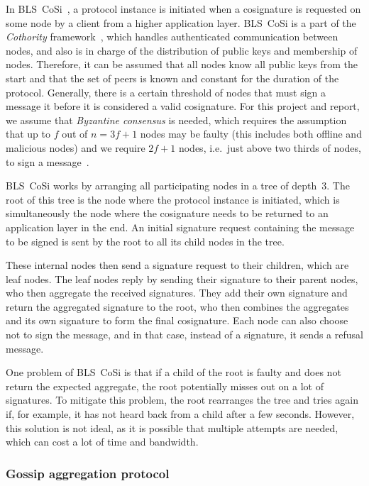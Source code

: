 In BLS~CoSi~\cite{Blscosi}, a protocol instance is initiated when a cosignature is requested on some node by a client from a higher application layer.
BLS~CoSi is a part of the \emph{Cothority} framework~\cite{Coth}, which handles authenticated communication between nodes, and also is in charge of the distribution of public keys and membership of nodes.
Therefore, it can be assumed that all nodes know all public keys from the start and that the set of peers is known and constant for the duration of the protocol. Generally, there is a certain threshold of nodes that must sign a message it before it is considered a valid cosignature.
For this project and report, we assume that \emph{Byzantine consensus} is needed, which requires the assumption that up to $f$ out of $n = 3f+1$ nodes may be faulty (this includes both offline and malicious nodes) and we require $2f+1$ nodes, i.e.~just above two thirds of nodes, to sign a message~\cite{Koko16}.

BLS~CoSi works by arranging all participating nodes in a tree of depth~3.
The root of this tree is the node where the protocol instance is initiated, which is simultaneously the node where the cosignature needs to be returned to an application layer in the end.
An initial signature request containing the message to be signed is sent by the root to all its child nodes in the tree.

These internal nodes then send a signature request to their children, which are leaf nodes. The leaf nodes reply by sending their signature to their parent nodes, who then aggregate the received signatures.
They add their own signature and return the aggregated signature to the root, who then combines the aggregates and its own signature to form the final cosignature. Each node can also choose not to sign the message, and in that case, instead of a signature, it sends a refusal message.

One problem of BLS~CoSi is that if a child of the root is faulty and does not return the expected aggregate, the root potentially misses out on a lot of signatures.
To mitigate this problem, the root rearranges the tree and tries again if, for example, it has not heard back from a child after a few seconds.
However, this solution is not ideal, as it is possible that multiple attempts are needed, which can cost a lot of time and bandwidth.

\subsubsection{Gossip aggregation protocol}

